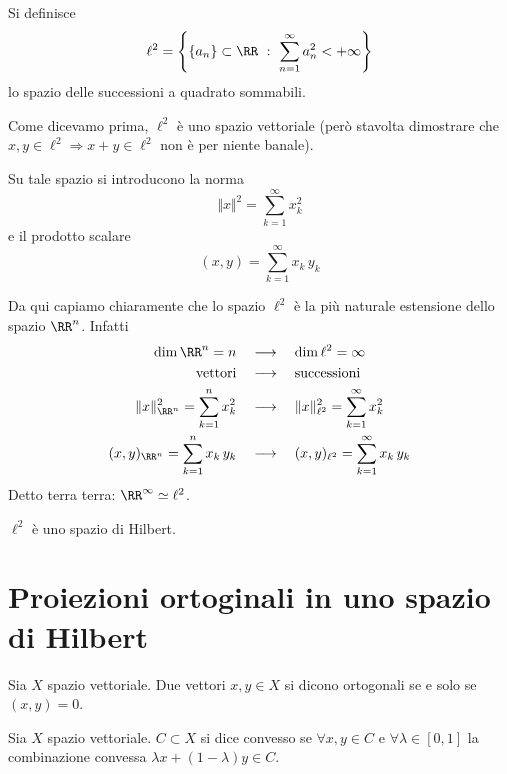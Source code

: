 \begin{defn}
Si definisce
\begin{equation*}
\ell^{2} = \left\{\{a_{n}\} \subset \RR\ :\ \sum\limits^{\infty}_{n = 1} a_{n}^{2} < + \infty \right\}
\end{equation*}
lo spazio delle successioni a quadrato sommabili.
\end{defn}
Come dicevamo prima, $\ell^2$ è uno spazio vettoriale (però stavolta dimostrare che $x,y\in\ell^2\Rightarrow x+y\in\ell^2$ non è per niente banale).

Su tale spazio si introducono la norma
\begin{equation*}
\Vert x\Vert^2=\sum_{k=1}^\infty x_k^2
\end{equation*}
e il  prodotto scalare
\begin{equation*}
(x,y)=\sum_{k=1}^\infty x_k\,y_k
\end{equation*}

Da qui capiamo chiaramente che lo spazio $\ell^2$ è la più naturale estensione dello spazio $\RR^n$. Infatti
\begin{align*}
\dim\RR^n=n \quad &\longrightarrow \quad \dim\ell^2=\infty \\
\text{vettori} \quad &\longrightarrow \quad \text{successioni} \\
\Vert x\Vert^2_{\RR^n}=\sum_{k=1}^n x_k^2 \quad &\longrightarrow \quad \Vert x\Vert^2_{\ell^2}=\sum_{k=1}^\infty x_k^2 \\
(x,y)_{\RR^n}=\sum_{k=1}^n x_k\, y_k \quad &\longrightarrow \quad (x,y)_{\ell^2}=\sum_{k=1}^\infty x_k\, y_k
\end{align*}
Detto terra terra: $\RR^\infty\simeq\ell^2$.

\begin{thm}
$\ell^2$ è uno spazio di Hilbert.
\end{thm}

\newpage


\section{Proiezioni ortoginali in uno spazio di Hilbert}

\begin{defn}
Sia $X$ spazio vettoriale. Due vettori $x,y\in X$ si dicono ortogonali se e solo se $(x,y)=0$.
\end{defn}

\begin{defn}
Sia $X$ spazio vettoriale. $C\subset X$ si dice convesso se $\forall x, y\in C$ e $\forall \lambda \in [0, 1]$ la combinazione convessa $\lambda x + (1 - \lambda) y\in C$.
\end{defn}

